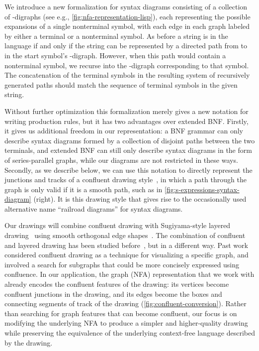 \documentclass[10pt]{llncs}
\begin{document}
We introduce a new formalization for syntax diagrams consisting of a collection of -digraphs (see e.g., \autoref{fig:nfa-representation-lisp}), each representing the possible expansions of a single nonterminal symbol, with each edge in each graph labeled by either a terminal or a nonterminal symbol. As before a string is in the language if and only if the string can be represented by a directed path from  to  in the start symbol's -digraph. However, when this path would contain a nonterminal symbol, we recurse into the -digraph corresponding to that symbol. The concatenation of the terminal symbols in the resulting system of recursively generated paths should match the sequence of terminal symbols in the given string.

Without further optimization this formalization merely gives a new notation for writing production rules, but it has two advantages over extended BNF. Firstly, it gives us additional freedom in our representation: a BNF grammar can only describe syntax diagrams formed by a collection of disjoint paths between the two terminals, and extended BNF can still only describe syntax diagrams in the form of series-parallel graphs, while our diagrams are not restricted in these ways. Secondly, as we describe below, we can use this notation to directly represent the junctions and tracks of a confluent drawing style~\cite{DicEppGooMen-GD-04}, in which a path through the graph is only valid if it is a smooth path, such as in \autoref{fig:s-expressions-syntax-diagram} (right). It is this drawing style that gives rise to the occasionally used alternative name ``railroad diagrams'' for syntax diagrams.

Our drawings will combine confluent drawing with Sugiyama-style layered drawing~\cite{SugTagSho-SMC-1981,BasMat-DGMM-01} using smooth orthogonal edge shapes~\cite{BekKauKob-JGAA-13}. The combination of confluent and layered drawing has been studied before~\cite{EppGooMen-GD-05}, but in a different way. Past work considered confluent drawing as a technique for visualizing a specific graph, and involved a search for subgraphs that could be more concisely expressed using confluence. In our application, the graph (NFA) representation that we work with already encodes the confluent features of the drawing: its vertices become confluent junctions in the drawing, and its edges become the boxes and connecting segments of track of the drawing (\autoref{fig:confluent-conversion}). Rather than searching for graph features that can become confluent, our focus is on modifying the underlying NFA to produce a simpler and higher-quality drawing while preserving the equivalence of the underlying context-free language described by the drawing.
\end{document}
